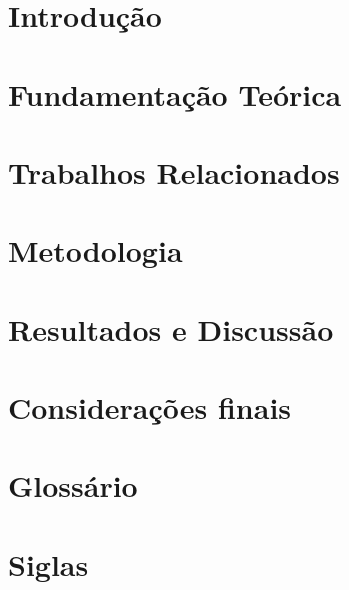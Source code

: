 \documentclass[tcc1, pos-defesa, english, brazil]{packages/ufgrc}
\begin{document}
\chapter{Introdução}
\label{ch:introducao}


\chapter{Fundamentação Teórica}
\label{ch:fundamentacao}
       

\chapter{Trabalhos Relacionados}
\label{ch:trabalhos-relacionados}
 

% 

\chapter{Metodologia}
\label{ch:metodologia}


\chapter{Resultados e Discussão}
\label{ch:resultados}


\chapter{Considerações finais}
\label{ch:consideracoes-finais}







\chapter{Glossário}


\chapter{Siglas}
 

\glsaddall
\printglossaries
\end{document}

